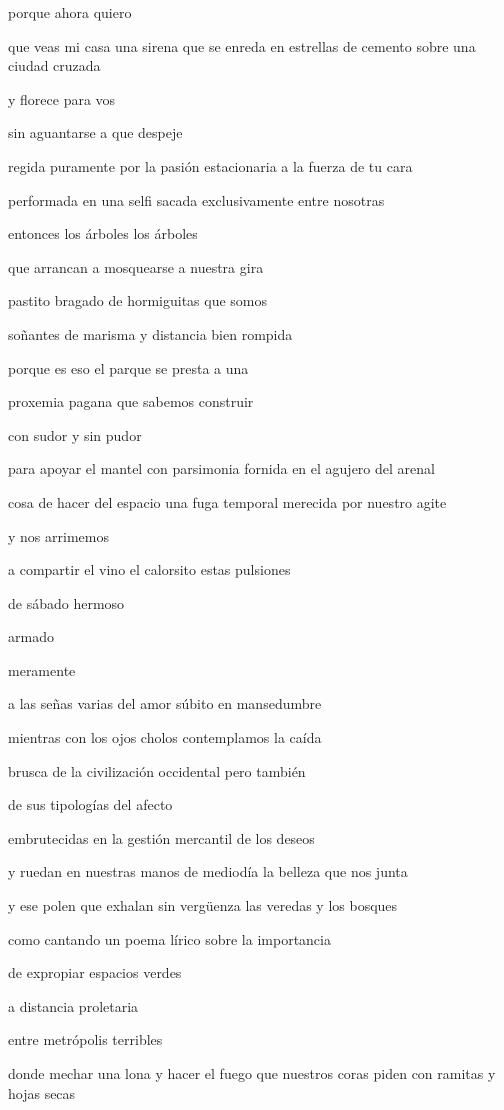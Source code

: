 \documentclass[
]{book}
\begin{document}
porque ahora quiero

que veas mi casa una sirena que se enreda en estrellas de cemento sobre una ciudad cruzada

y florece para vos

sin aguantarse a que despeje

regida puramente por la pasión estacionaria a la fuerza de tu cara

performada en una selfi sacada exclusivamente entre nosotras

entonces los árboles los árboles

que arrancan a mosquearse a nuestra gira

pastito bragado de hormiguitas que somos

soñantes de marisma y distancia bien rompida

porque es eso el parque se presta a una

proxemia pagana que sabemos construir

con sudor y sin pudor

para apoyar el mantel con parsimonia fornida en el agujero del arenal

cosa de hacer del espacio una fuga temporal merecida por nuestro agite

y nos arrimemos

a compartir el vino el calorsito estas pulsiones

de sábado hermoso

armado

meramente

a las señas varias del amor súbito en mansedumbre

mientras con los ojos cholos contemplamos la caída

brusca de la civilización occidental pero también

de sus tipologías del afecto

embrutecidas en la gestión mercantil de los deseos

y ruedan en nuestras manos de mediodía la belleza que nos junta

y ese polen que exhalan sin vergüenza las veredas y los bosques

como cantando un poema lírico sobre la importancia

de expropiar espacios verdes

a distancia proletaria

entre metrópolis terribles

donde mechar una lona y hacer el fuego que nuestros coras piden con ramitas y hojas secas
\end{document}
